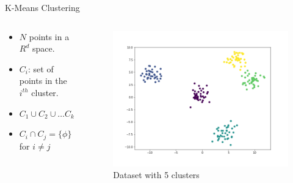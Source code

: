 \documentclass{beamer}
\begin{document}
\begin{frame}{K-Means Clustering}
\begin{columns}[T]
  \begin{column}{0.5\textwidth}
  \begin{itemize}
\item $N$ points in a $R^d$ space.
\item $C_i$: set of points in the $i^{th}$ cluster.
\item $C_1 \cup C_2 \cup \ldots C_k = \{1, \ldots , n\}$
\item $C_i \cap C_j = \{\phi \}$ for $i\neq j$
\end{itemize}
  \end{column}
  \begin{column}{0.5\textwidth}
\begin{figure}[htp]
    \centering
    \includegraphics[width=\linewidth]{unsupervised/k_1.png}
    \caption{Dataset with 5 clusters}
\end{figure}  
  \end{column}
\end{columns}
\end{frame}
\end{document}
